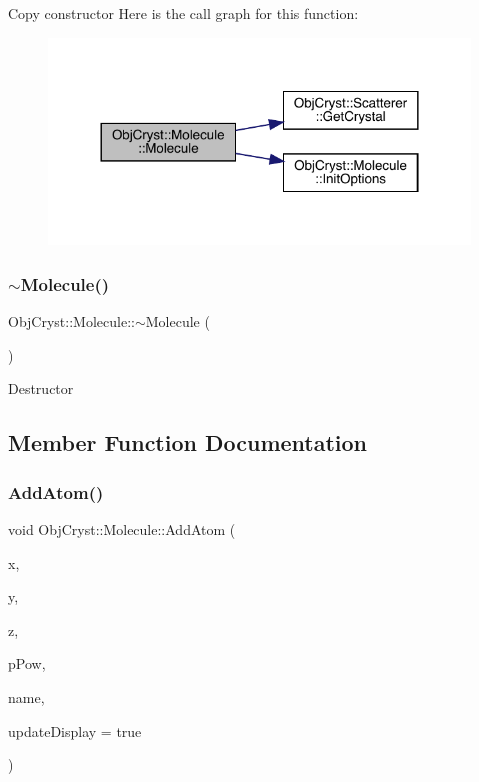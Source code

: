 Copy constructor Here is the call graph for this function\+:
\nopagebreak
\begin{figure}[H]
\begin{center}
\leavevmode
\includegraphics[width=317pt]{class_obj_cryst_1_1_molecule_a896c80a621aa990de3d36e214965cd49_cgraph}
\end{center}
\end{figure}
\mbox{\label{class_obj_cryst_1_1_molecule_ae61d3a9a72c73cd087e330b3c4cdf0be}} 
\subsubsection{\texorpdfstring{$\sim$Molecule()}{~Molecule()}}
{\footnotesize\ttfamily Obj\+Cryst\+::\+Molecule\+::$\sim$\+Molecule (\begin{DoxyParamCaption}{ }\end{DoxyParamCaption})}

Destructor 

\subsection{Member Function Documentation}
\mbox{\label{class_obj_cryst_1_1_molecule_a7b193eac062233b758887cba671706f7}} 
\subsubsection{\texorpdfstring{AddAtom()}{AddAtom()}}
{\footnotesize\ttfamily void Obj\+Cryst\+::\+Molecule\+::\+Add\+Atom (\begin{DoxyParamCaption}\item[{const R\+E\+AL}]{x,  }\item[{const R\+E\+AL}]{y,  }\item[{const R\+E\+AL}]{z,  }\item[{const \mbox{\hyperlink{class_obj_cryst_1_1_scattering_power}{Scattering\+Power}} $\ast$}]{p\+Pow,  }\item[{const string \&}]{name,  }\item[{const bool}]{update\+Display = {\ttfamily true} }\end{DoxyParamCaption})}

